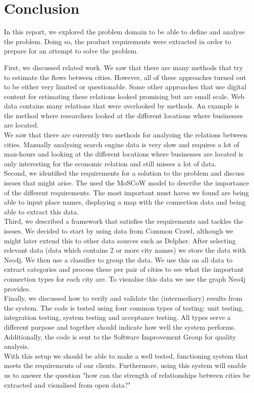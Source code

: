 \section{Conclusion}
In this report, we explored the problem domain to be able to define and analyse the problem. Doing so, the product requirements were extracted in order to prepare for an attempt to solve the problem.

First, we discussed related work. We saw that there are many methods that try to estimate the flows between cities. However, all of these approaches turned out to be either very limited or questionable. Some other approaches that use digital content for estimating these relations looked promising but are small scale. Web data contains many relations that were overlooked by methods. An example is the method where researchers looked at the different locations where businesses are located. \\

We saw that there are currently two methods for analysing the relations between cities. Manually analysing search engine data is very slow and requires a lot of man-hours and looking at the different locations where businesses are located is only interesting for the economic relation and still misses a lot of data.
\\

Second, we identified the requirements for a solution to the problem and discuss issues that might arise. The used the MoSCoW model to describe the importance of the different requirements. The most important must haves we found are being able to input place names, displaying a map with the connection data and being able to extract this data.
\\

Third, we described a framework that satisfies the requirements and tackles the issues. We decided to start by using data from Common Crawl, although we might later extend this to other data sources such as Delpher. After selecting relevant data (data which contains 2 or more city names) we store the data with Neo4j. We then use a classifier to group the data. We use this on all data to extract categories and process these per pair of cities to see what the important connection types for each city are. To visualise this data we use the graph Neo4j provides.
\\

Finally, we discussed how to verify and validate the (intermediary) results from the system. The code is tested using four common types of testing: unit testing, integration testing, system testing and acceptance testing. All types serve a different purpose and together should indicate how well the system performs. Additionally, the code is sent to the Software Improvement Group for quality analysis.
\\

With this setup we should be able to make a well tested, functioning system that meets the requirements of our clients. Furthermore, using this system will enable us to answer the question "how can the strength of relationships between cities be extracted and visualised from open data?" 